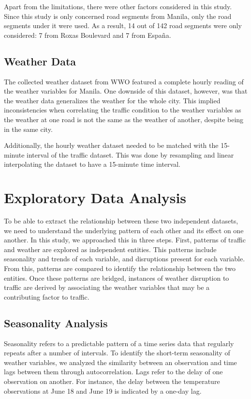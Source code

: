 Apart from the limitations, there were other factors considered in this study. Since this study is only concerned road segments from Manila, only the road segments under it were used. As a result, 14 out of 142 road segments were only considered: 7 from Roxas Boulevard and 7 from España.

\subsection{Weather Data}
The collected weather dataset from WWO featured a complete hourly reading of the weather variables for Manila. One downside of this dataset, however, was that the weather data generalizes the weather for the whole city. This implied inconsistencies when correlating the traffic condition to the weather variables as the weather at one road is not the same as the weather of another, despite being in the same city.

Additionally, the hourly weather dataset needed to be matched with the 15-minute interval of the traffic dataset. This was done by resampling and linear interpolating the dataset to have a 15-minute time interval.

\section{Exploratory Data Analysis}
To be able to extract the relationship between these two independent datasets, we need to understand the underlying pattern of each other and its effect on one another. In this study, we approached this in three steps. First, patterns of traffic and weather are explored as independent entities. This patterns include seasonality and trends of each variable, and disruptions present for each variable. From this, patterns are compared to identify the relationship between the two entities. Once these patterns are bridged, instances of weather disruption to traffic are derived by associating the weather variables that may be a contributing factor to traffic.

\subsection{Seasonality Analysis}
Seasonality refers to a predictable pattern of a time series data that regularly repeats after a number of intervals. To identify the short-term seasonality of weather variables, we analyzed the similarity between an observation and time lags between them through autocorrelation. Lags refer to the delay of one observation on another. For instance, the delay between the temperature observations at June 18 and June 19 is indicated by a one-day lag.

